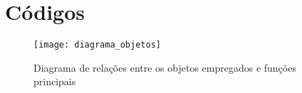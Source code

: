 \chapter{Códigos} \label{Chap:Apendice2}

\begin{figure}[hbt]
	\centering
	\texttt{[image: diagrama\_objetos]}
	\caption{Diagrama de relações entre os objetos empregados e funções principais}
	\label{img_diagrama_objetos}
\end{figure}